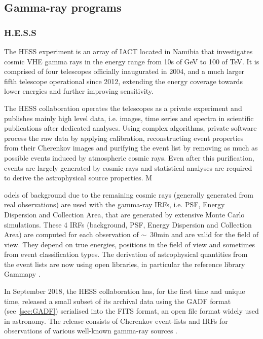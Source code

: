\documentclass[11pt,a4paper]{ivoa}
\begin{document}
\subsection{Gamma-ray programs}

\subsubsection{H.E.S.S}
\label{sec:hess}

The \gls{HESS} experiment is an array of \gls{IACT}
located in Namibia that investigates cosmic \gls{VHE} gamma rays in the energy range from 10s of GeV to
100 of TeV. It is comprised of four telescopes officially inaugurated in 2004, and a much larger fifth telescope
operational since 2012, extending the energy coverage towards lower energies and further improving sensitivity.

The \gls{HESS} collaboration operates the telescopes as a private experiment and publishes mainly high level data,
i.e. images, time series and spectra in scientific publications after dedicated analyses. Using complex algorithms,
private software process the raw data by applying calibration, reconstructing event properties from their Cherenkov
images and purifying the event list by removing as much as possible events induced by atmospheric cosmic rays. Even
after this purification, events are largely generated by cosmic rays and statistical analyses are required to derive
the astrophysical source properties. M

odels of background due to the remaining cosmic rays
(generally generated from real observations) are used with the gamma-ray \gls{IRF}s, i.e. \gls{PSF}, Energy Dispersion and Collection Area,
that are generated by extensive Monte Carlo simulations. These 4 \gls{IRF}s (background, \gls{PSF}, Energy Dispersion and Collection Area) are computed
for each observation of $\sim$~30min and are valid for the field of view. They depend on true energies, positions in the
field of view and sometimes from event classification types. The derivation of astrophysical quantities from
the event lists are now using open libraries, in particular the reference library Gammapy \citep{gammapy:2023}.

In September 2018, the \gls{HESS} collaboration has, for the first time and unique time, released a small subset of its
archival data using the GADF format (see~\ref{sec:GADF}) serialised into the \gls{FITS} format,
an open file format widely used in astronomy. The release consists of Cherenkov event-lists and \gls{IRF}s for observations of
various well-known gamma-ray sources \citep{hess-zenodo.1421098}.
\end{document}

